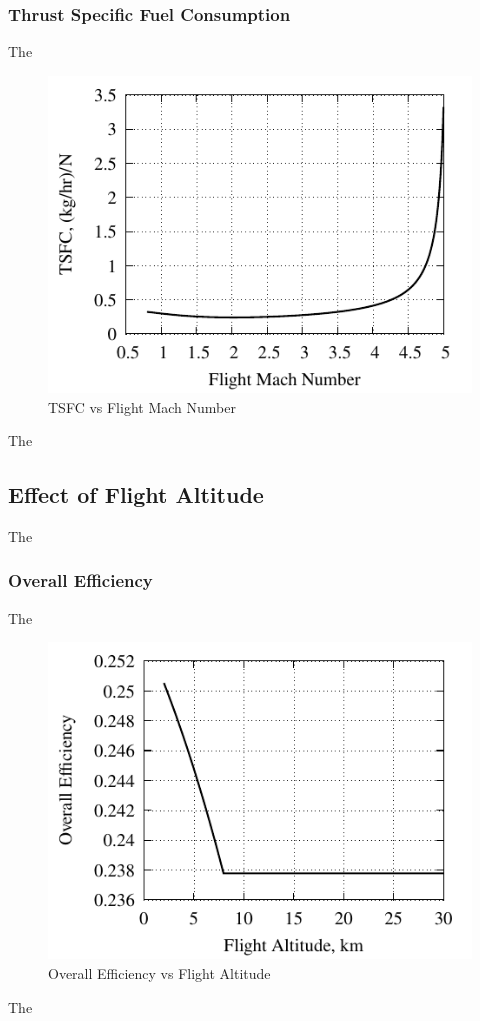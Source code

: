 \documentclass[conf]{new-aiaa} %
\begin{document}
\subsubsection{Thrust Specific Fuel Consumption}
The

\begin{figure}[hbt!] %
    \centering
    \includegraphics[]{media/performance_parameter_files/part_c_TSFC.pdf}
    \caption{\label{fig:partctsfc}TSFC vs Flight Mach Number}
\end{figure}
The

\subsection{Effect of Flight Altitude} %
The

\subsubsection{Overall Efficiency}
The

\begin{figure}[hbt!] %
    \centering
    \includegraphics[]{media/performance_parameter_files/part_d_eta_o.pdf}
    \caption{\label{fig:partdetao}Overall Efficiency vs Flight Altitude}
\end{figure}
The
\end{document}
